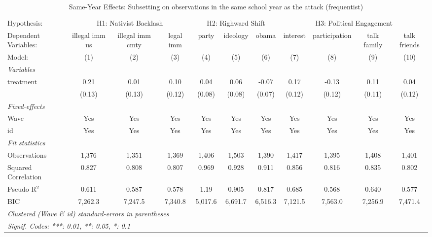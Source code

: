 
\begin{table}[htbp]
   \caption{\label{tab:same_year} Same-Year Effects: Subsetting on observations in the same school year as the attack (frequentist)}
   \centering
   \begin{tabular}{lcccccccccc}
      \tabularnewline \midrule \midrule
      Hypothesis: & \multicolumn{3}{c}{H1: Nativist Backlash} & \multicolumn{3}{c}{H2: Righward Shift} & \multicolumn{4}{c}{H3: Political Engagement} \\ 
      Dependent Variables: & illegal imm us & illegal imm cmty & legal imm & party   & ideology & obama   & interest & participation & talk family & talk friends\\  
      Model:               & (1)            & (2)              & (3)       & (4)     & (5)      & (6)     & (7)      & (8)           & (9)         & (10)\\  
      \midrule
      \emph{Variables}\\
      treatment            & 0.21           & 0.01             & 0.10      & 0.04    & 0.06     & -0.07   & 0.17     & -0.13         & 0.11        & 0.04\\   
                           & (0.13)         & (0.13)           & (0.12)    & (0.08)  & (0.08)   & (0.07)  & (0.12)   & (0.12)        & (0.11)      & (0.12)\\   
      \midrule
      \emph{Fixed-effects}\\
      Wave                 & Yes            & Yes              & Yes       & Yes     & Yes      & Yes     & Yes      & Yes           & Yes         & Yes\\  
      id                   & Yes            & Yes              & Yes       & Yes     & Yes      & Yes     & Yes      & Yes           & Yes         & Yes\\  
      \midrule
      \emph{Fit statistics}\\
      Observations         & 1,376          & 1,351            & 1,369     & 1,406   & 1,503    & 1,390   & 1,417    & 1,395         & 1,408       & 1,401\\  
      Squared Correlation  & 0.827          & 0.808            & 0.807     & 0.969   & 0.928    & 0.911   & 0.856    & 0.816         & 0.835       & 0.802\\  
      Pseudo R$^2$         & 0.611          & 0.587            & 0.578     & 1.19    & 0.905    & 0.817   & 0.685    & 0.568         & 0.640       & 0.577\\  
      BIC                  & 7,262.3        & 7,247.5          & 7,340.8   & 5,017.6 & 6,691.7  & 6,516.3 & 7,121.5  & 7,563.0       & 7,256.9     & 7,471.4\\  
      \midrule \midrule
      \multicolumn{11}{l}{\emph{Clustered (Wave \& id) standard-errors in parentheses}}\\
      \multicolumn{11}{l}{\emph{Signif. Codes: ***: 0.01, **: 0.05, *: 0.1}}\\
   \end{tabular}
\end{table}


